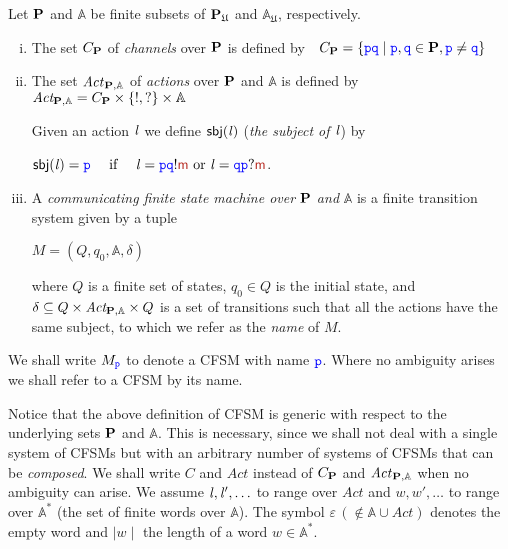 \begin{definition}\label{def:cfsm}%
Let $\mathbf{P}$  and $\mathbb{A}$ be finite subsets of $\mathbf{P}_\mathfrak{U}$ and $\mathbb{A}_\mathfrak{U}$, respectively.
\begin{enumerate}[i)] 
\item
The set $C_{\mathbf{P}}$ of {\em channels} over $\mathbf{P}$ is defined by\ \
$C_{\mathbf{P}}=\{{\mathtt{\color{blue}{ {p}}}}{\mathtt{\color{blue}{ {q}}}} \mid { \ensuremath{\mathtt{\color{blue}{ {p}}}} },{\mathtt{\color{blue}{ {q}}}}\in \mathbf{P}, {\mathtt{\color{blue}{ {p}}}}\neq{ \ensuremath{\mathtt{\color{blue}{ {q}}}} }\}$
\item
The set $\mathit{Act}_{\mathbf{P},\mathbb{A}}$ of {\em actions}  over $\mathbf{P}$ and $\mathbb{A}$ is defined by\ 
$\textit{Act}_{\mathbf{P},\mathbb{A}} = C_{\mathbf{P}}\times\{!,?\}\times\mathbb{A}$

Given an action $\mathit{l}$ we define $\mathsf{sbj}(\mathit{l})$ ({\em the subject of $\mathit{l}$}) by  \\
\centerline{
$\subj{\elle}=\ttp\quad \text{ if } \quad \elle=\ttp\ttq!\msg[m] \text{ or }\elle=\ttq\ttp?\msg[m]$.}
\item
\label{def:cfsm-iii}
A {\em communicating finite state machine over} $\mathbf{P}$ \emph{and} $\mathbb{A}$
is a finite transition system given by a tuple\\
\centerline{ $M=(Q,q_0,\mathbb{A},\delta)$ }
where $Q$ is a finite set of states, $q_0\in Q$ is the initial state, and
$\delta\subseteq Q\times\textit{Act}_{\mathbf{P},\mathbb{A}}\times Q$ is a set of transitions
such that all the actions have the same subject, to which we refer as the {\em name} of $M$.
\end{enumerate}
\end{definition}
\noindent
We shall write $M_{{\mathtt{\color{blue}{ {p}}}}}$ to denote a CFSM with name ${\mathtt{\color{blue}{ {p}}}}$. 
Where no ambiguity arises we shall refer to a CFSM by its name.


Notice that the above definition of CFSM is generic with respect to the underlying sets
$\mathbf{P}$ and $\mathbb{A}$.
This is necessary,  since we shall not deal with a single system of CFSMs but with an arbitrary number of  systems of CFSMs that can be {\em composed}.
We shall write $C$ and $\mathit{Act}$ instead of $C_{\mathbf{P}}$ and $\mathit{Act}_{\mathbf{P},\mathbb{A}}$ when no ambiguity can arise.
 We assume $\mathit{l},\mathit{l}',\ldots$ to range over $\textit{Act}$
and $w,w',\ldots$ to range over $\mathbb{A}^*$ (the set of finite words over $\mathbb{A}$).
The symbol $\varepsilon\,(\notin \mathbb{A}\cup\textit{Act})$ denotes the empty word and 
$\mid w\mid$ the length of a word $w\in \mathbb{A}^*$.

